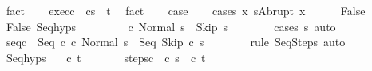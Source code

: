 \begin{isabellebody}
\ fact\isanewline
\ \ \isamarkupfalse%
\ exec{\isacharunderscore}c\ {\isachardoublequoteopen}{\isasymGamma}{\isasymturnstile}\ {\isasymlangle}cs{\isacharprime}{\isasymrangle}\ {\isasymRightarrow}\ t{\isachardoublequoteclose}\ \isamarkupfalse%
\ fact\isanewline
\ \ \isamarkupfalse%
\ {\isacharquery}case\isanewline
\ \ \isamarkupfalse%
\ {\isacharparenleft}cases\ {\isachardoublequoteopen}{\isasymexists}x{\isachardot}\ s{\isacharprime}{\isacharequal}Abrupt\ x{\isachardoublequoteclose}{\isacharparenright}\isanewline
\ \ \ \ \isamarkupfalse%
\ False\isanewline
\ \ \ \ \isamarkupfalse%
\ False\ Seq{\isachardot}hyps\ {\isacharparenleft}{}{\isacharparenright}\ \isanewline
\ \ \ \ \isamarkupfalse%
\ {\isachardoublequoteopen}{\isasymGamma}{\isasymturnstile}\ {\isacharparenleft}c\ Normal\ s{\isacharparenright}\ {\isasymrightarrow}\isactrlsup {\isacharasterisk}\ {\isacharparenleft}Skip{\isacharcomma}\ s{\isacharprime}{\isacharparenright}{\isachardoublequoteclose}\isanewline
\ \ \ \ \ \ \isamarkupfalse%
\ {\isacharparenleft}cases\ s{\isacharprime}{\isacharparenright}\ auto\isanewline
\ \ \ \ \isamarkupfalse%
\ seq{\isacharunderscore}c\ {\isachardoublequoteopen}{\isasymGamma}{\isasymturnstile}\ {\isacharparenleft}Seq\ c\ c\ Normal\ s{\isacharparenright}\ {\isasymrightarrow}\isactrlsup {\isacharasterisk}\ {\isacharparenleft}Seq\ Skip\ c\ s{\isacharprime}{\isacharparenright}{\isachardoublequoteclose}\isanewline
\ \ \ \ \ \ \isamarkupfalse%
\ {\isacharparenleft}rule\ SeqSteps{\isacharparenright}\ auto\isanewline
\ \ \ \ \isamarkupfalse%
\ Seq{\isachardot}hyps\ {\isacharparenleft}{}{\isacharparenright}\ \isamarkupfalse%
\ c{\isacharprime}\ t{\isacharprime}\ \isanewline
\ \ \ \ \ \ steps{\isacharunderscore}c\ {\isachardoublequoteopen}{\isasymGamma}{\isasymturnstile}\ {\isacharparenleft}c\ s{\isacharprime}{\isacharparenright}\ {\isasymrightarrow}\isactrlsup {\isacharasterisk}\ {\isacharparenleft}c{\isacharprime}{\isacharcomma}\ t{\isacharprime}{\isacharparenright}{\isachardoublequoteclose}\ \isanewline

\end{isabellebody}
